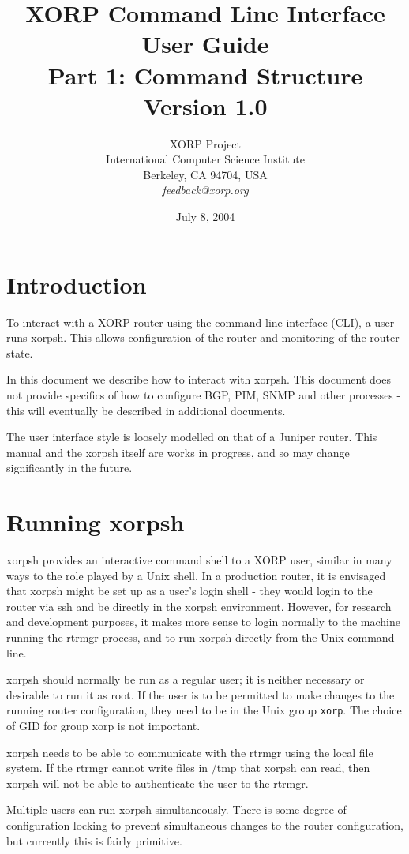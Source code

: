 \documentclass[11pt]{article}
\title{XORP Command Line Interface User Guide\\
Part 1: Command Structure \\
\vspace{1ex}
Version 1.0}
\author{ XORP Project					\\
	 International Computer Science Institute	\\
	 Berkeley, CA 94704, USA			\\
	 {\it feedback@xorp.org}
}
\date{July 8, 2004}
\newcommand{\xorpsh}{{\sf\small xorpsh}\xspace}
\begin{document}
\maketitle

\section{Introduction}
To interact with a XORP router using the command line interface (CLI),
a user runs \xorpsh.  This allows configuration of the router and
monitoring of the router state.  

In this document we describe how to interact with \xorpsh.  This
document does not provide specifics of how to configure BGP, PIM, SNMP
and other processes - this will eventually be described in additional
documents.

The user interface style is loosely modelled on that of a Juniper
router.  This manual and the xorpsh itself are works in progress, and
so may change significantly in the future.

\section{Running xorpsh}
\xorpsh provides an interactive command shell to a XORP user, similar
in many ways to the role played by a Unix shell.  In a production
router, it is envisaged that \xorpsh might be set up as a user's login
shell - they would login to the router via ssh and be directly in the
\xorpsh environment.  However, for research and development purposes,
it makes more sense to login normally to the machine running the
rtrmgr process, and to run \xorpsh directly from the Unix command line.

\xorpsh should normally be run as a regular user; it is neither
necessary or desirable to run it as root.  If the user is to be
permitted to make changes to the running router configuration, they
need to be in the Unix group {\tt xorp}.  The choice of GID for group
xorp is not important.

\xorpsh needs to be able to communicate with the rtrmgr using the local
file system.  If the rtrmgr cannot write files in /tmp that \xorpsh
can read, then \xorpsh will not be able to authenticate the user to the
rtrmgr.

Multiple users can run \xorpsh simultaneously.  There is some degree of
configuration locking to prevent simultaneous changes to the router
configuration, but currently this is fairly primitive.
\end{document}
